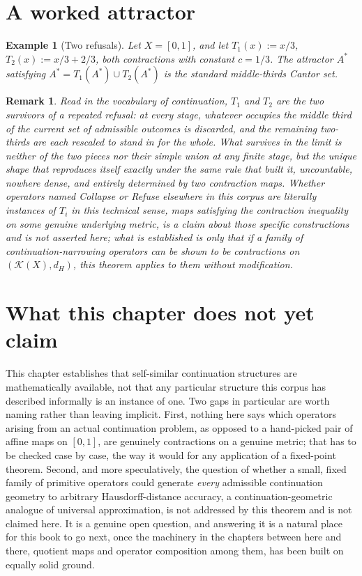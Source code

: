 \documentclass[11pt]{report}
\newtheorem{remark}{Remark}[chapter]
\newtheorem{example}{Example}[chapter]
\begin{document}
\section*{A worked attractor}

\begin{example}[Two refusals]
Let $X = [0,1]$, and let $T_1(x) := x/3$, $T_2(x) := x/3 + 2/3$, both
contractions with constant $c = 1/3$. The attractor $A^\ast$ satisfying
$A^\ast = T_1(A^\ast) \cup T_2(A^\ast)$ is the standard middle-thirds
Cantor set.
\end{example}

\begin{remark}
Read in the vocabulary of continuation, $T_1$ and $T_2$ are the two
survivors of a repeated refusal: at every stage, whatever occupies the
middle third of the current set of admissible outcomes is discarded,
and the remaining two-thirds are each rescaled to stand in for the
whole. What survives in the limit is neither of the two pieces nor
their simple union at any finite stage, but the unique shape that
reproduces itself exactly under the same rule that built it,
uncountable, nowhere dense, and entirely determined by two contraction
maps. Whether operators named Collapse or Refuse elsewhere in this
corpus are literally instances of $T_i$ in this technical sense, maps
satisfying the contraction inequality on some genuine underlying
metric, is a claim about those specific constructions and is not
asserted here; what is established is only that \emph{if} a family of
continuation-narrowing operators can be shown to be contractions on
$(\mathcal{K}(X), d_H)$, this theorem applies to them without
modification.
\end{remark}

\section*{What this chapter does not yet claim}

This chapter establishes that self-similar continuation structures are
mathematically available, not that any particular structure this
corpus has described informally is an instance of one. Two gaps in
particular are worth naming rather than leaving implicit. First,
nothing here says which operators arising from an actual continuation
problem, as opposed to a hand-picked pair of affine maps on $[0,1]$,
are genuinely contractions on a genuine metric; that has to be checked
case by case, the way it would for any application of a fixed-point
theorem. Second, and more speculatively, the question of whether a
small, fixed family of primitive operators could generate \emph{every}
admissible continuation geometry to arbitrary Hausdorff-distance
accuracy, a continuation-geometric analogue of universal approximation,
is not addressed by this theorem and is not claimed here. It is a
genuine open question, and answering it is a natural place for this
book to go next, once the machinery in the chapters between here and
there, quotient maps and operator composition among them, has been
built on equally solid ground.
\end{document}
